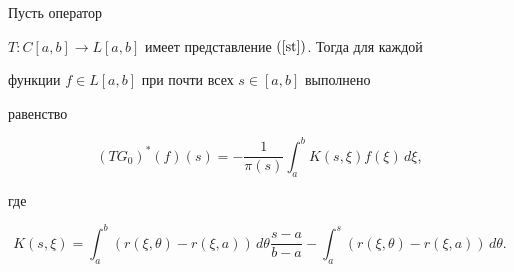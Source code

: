 \begin{lems}


\label{l2}


Пусть оператор


$T: C[a,b]\to L[a,b]$ имеет представление $(\ref{st})$. Тогда для каждой


функции $f\in L[a,b]$ при почти всех $s\in[a,b]$ выполнено


равенство


\begin{equation*}%


(TG_0)^*(f)(s)=-\dfrac{1}{\pi(s)}


\int_a^bK(s,\xi)f(\xi)\,d\xi,


\end{equation*}


где


\begin{equation}\label{K}


K(s,\xi)=\int_a^b(r(\xi,\theta)-r(\xi,a))\,d\theta


\frac{s-a}{b-a}-\int_a^s(r(\xi,\theta)-r(\xi,a))\,


d\theta.


\end{equation}


\end{lems}





